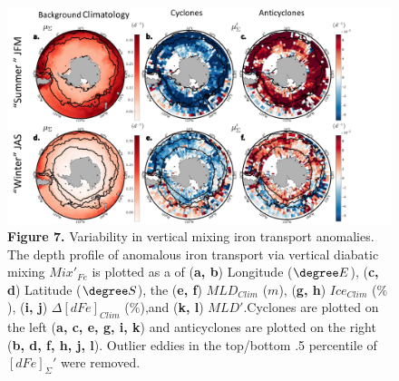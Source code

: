 \begin{figure}[!htbp]
    \begin{adjustwidth}{-3.6in}{-1.2in}
    \centering
        \includegraphics[scale=1]{Fig7.pdf}
    \end{adjustwidth}
    \caption[Variability in vertical mixing iron transport anomalies]
    {\textbf{Figure 7.} Variability in vertical mixing iron transport anomalies. The depth profile of anomalous iron transport via vertical diabatic mixing $Mix'_{Fe}$ is plotted as a of (\textbf{a, b}) Longitude ($\degree E$), (\textbf{c, d}) Latitude ($\degree S$), the (\textbf{e, f}) $MLD_{Clim}$ ($m$), (\textbf{g, h}) $Ice_{Clim}$ ($\%$), (\textbf{i, j}) $\Delta[dFe]_{Clim}$ ($\%$),and (\textbf{k, l}) $MLD'$.Cyclones are plotted on the left (\textbf{a, c, e, g, i, k}) and anticyclones are plotted on the right (\textbf{b, d, f, h, j, l}). Outlier eddies in the top/bottom .5 percentile of $[dFe]_\Sigma'$ were removed. }
\label{fig:Fig7}
\end{figure}





